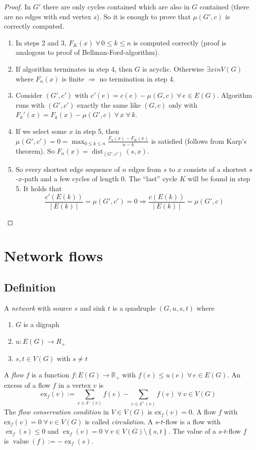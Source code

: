 \documentclass{article}
\newcommand{\card}[1]{\left|\:\!#1\:\!\right|}
\newcommand{\set}[1]{\left\{#1\right\}}
\newcommand{\gath}[2]{$#1$-$#2$-path} %
\newcommand{\flow}[2]{$#1$-$#2$-flow}
\newcommand{\fall}{\;\forall\,}
\DeclareMathOperator{\ex}{ex}
\begin{document}
\begin{proof}
  In $G'$ there are only cycles contained which are also in $G$ contained (there are no edges with end vertex $s$). So it is enough to prove that $\mu(G', c)$ is correctly computed.

  \begin{enumerate}
    \item In steps 2 and 3, $F_K(x) \fall 0 \leq k \leq n$ is computed correctly (proof is analogous to proof of Bellman-Ford-algorithm).
    \item If algorithm terminates in step 4, then $G$ is acyclic. Otherwise $\exists x in V(G)$ where $F_n(x)$ is finite $\Rightarrow$ no termination in step 4.
    \item Consider $(G', c')$ with $c'(e) = c(e) - \mu(G, c) \fall e \in E(G)$. Algorithm runs with $(G', c')$ exactly the same like $(G, c)$ only with $F_k'(x) = F_k(x) - \mu(G', c) \fall x \fall k$.
    \item If we select some $x$ in step 5, then $\mu(G', c') = 0 = \max_{0 \leq k \leq n} \frac{F_n(x) - F_K(x)}{n-k}$ is satisfied (follows from Karp's theorem). So $F_n(x) = \operatorname{dist}_{(G', c')}(s, x)$.
    \item So every shortest edge sequence of $n$ edges from $s$ to $x$ consists of a shortest \gath sx and a few cycles of length $0$. The ``last'' cycle $K$ will be found in step 5. It holds that
    \[
      \frac{c'(E(k))}{\card{E(k)}} = \mu(G', c') = 0 \Rightarrow \frac{c(E(k))}{\card{E(k)}} = \mu(G', c)
    \]
  \end{enumerate}
\end{proof}

\section{Network flows}
%
\subsection{Definition}
%
A \emph{network} with source $s$ and sink $t$ is a quadruple $(G, u, s, t)$ where
\begin{enumerate}
  \item $G$ is a digraph
  \item $u: E(G) \rightarrow R_+$
  \item $s, t \in V(G)$ with $s \neq t$
\end{enumerate}

A \emph{flow} $f$ is a function $f: E(G) \rightarrow \mathbb{R}_+$ with $f(e) \leq u(e) \fall e \in E(G)$. An excess of a flow $f$ in a vertex $v$ is
\[
  \text{ex}_f(v) :=
    \sum_{e \in \delta^-(v)} f(e) -
    \sum_{e \in \delta^+(v)} f(e)
    \fall v \in V(G)
\]
The \emph{flow conservation condition} in $V \in V(G)$ is $\text{ex}_f(v) = 0$. A flow $f$ with $\text{ex}_f(v) = 0 \fall v \in V(G)$ is called \emph{circulation}. A \flow st is a flow with $\ex_f(s) \leq 0$ and $\ex_f(v) = 0 \fall v \in V(G) \setminus \set{s, t}$. The value of a \flow st $f$ is $\operatorname{value}(f) := -\ex_f(s)$.
\end{document}
